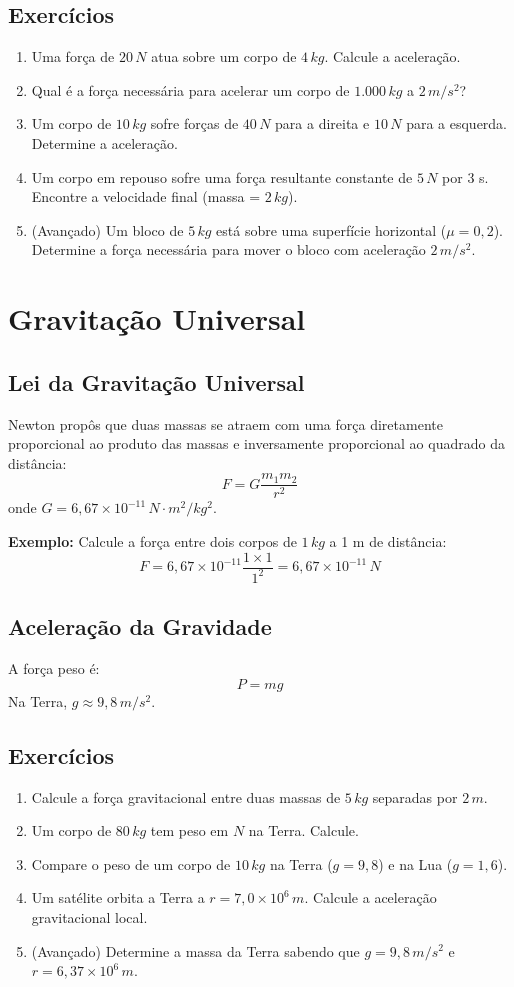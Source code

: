 \documentclass[12pt,a4paper]{article}
\begin{document}
\subsection{Exercícios}
\begin{enumerate}
\item Uma força de $20\,N$ atua sobre um corpo de $4\,kg$. Calcule a aceleração.
\item Qual é a força necessária para acelerar um corpo de $1.000\,kg$ a $2\,m/s^2$?
\item Um corpo de $10\,kg$ sofre forças de $40\,N$ para a direita e $10\,N$ para a esquerda. Determine a aceleração.
\item Um corpo em repouso sofre uma força resultante constante de $5\,N$ por 3 s. Encontre a velocidade final (massa = $2\,kg$).
\item (Avançado) Um bloco de $5\,kg$ está sobre uma superfície horizontal ($\mu=0{,}2$). Determine a força necessária para mover o bloco com aceleração $2\,m/s^2$.
\end{enumerate}

\section{Gravitação Universal}

\subsection{Lei da Gravitação Universal}
Newton propôs que duas massas se atraem com uma força diretamente proporcional ao produto das massas e inversamente proporcional ao quadrado da distância:
\[
F = G \frac{m_1 m_2}{r^2}
\]
onde $G = 6{,}67 \times 10^{-11}\,N \cdot m^2/kg^2$.

\textbf{Exemplo:} Calcule a força entre dois corpos de $1\,kg$ a 1 m de distância:
\[
F = 6{,}67 \times 10^{-11} \frac{1 \times 1}{1^2} = 6{,}67 \times 10^{-11}\,N
\]

\subsection{Aceleração da Gravidade}
A força peso é:
\[
P = m g
\]
Na Terra, $g \approx 9{,}8\,m/s^2$.

\subsection{Exercícios}
\begin{enumerate}
\item Calcule a força gravitacional entre duas massas de $5\,kg$ separadas por $2\,m$.
\item Um corpo de $80\,kg$ tem peso em $N$ na Terra. Calcule.
\item Compare o peso de um corpo de $10\,kg$ na Terra ($g=9{,}8$) e na Lua ($g=1{,}6$).
\item Um satélite orbita a Terra a $r = 7{,}0 \times 10^6\,m$. Calcule a aceleração gravitacional local.
\item (Avançado) Determine a massa da Terra sabendo que $g=9{,}8\,m/s^2$ e $r=6{,}37 \times 10^6\,m$.
\end{enumerate}
\end{document}

